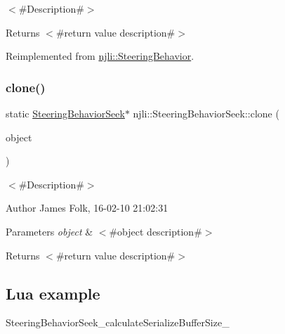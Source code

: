 $<$\#\+Description\#$>$

\begin{DoxyReturn}{Returns}
$<$\#return value description\#$>$ 
\end{DoxyReturn}


Reimplemented from \mbox{\hyperlink{classnjli_1_1_steering_behavior_abbc461d853c1b225cfde5b79d96d11bd}{njli\+::\+Steering\+Behavior}}.

\mbox{\label{classnjli_1_1_steering_behavior_seek_ae9baeaddd6dff6b7caa469e4343f9295}} 
\subsubsection{\texorpdfstring{clone()}{clone()}}
{\footnotesize\ttfamily static \mbox{\hyperlink{classnjli_1_1_steering_behavior_seek}{Steering\+Behavior\+Seek}}$\ast$ njli\+::\+Steering\+Behavior\+Seek\+::clone (\begin{DoxyParamCaption}\item[{const \mbox{\hyperlink{classnjli_1_1_steering_behavior_seek}{Steering\+Behavior\+Seek}} \&}]{object }\end{DoxyParamCaption})\hspace{0.3cm}{\ttfamily [static]}}



$<$\#\+Description\#$>$ 

\begin{DoxyAuthor}{Author}
James Folk, 16-\/02-\/10 21\+:02\+:31
\end{DoxyAuthor}

\begin{DoxyParams}{Parameters}
{\em object} & $<$\#object description\#$>$\\
\hline
\end{DoxyParams}
\begin{DoxyReturn}{Returns}
$<$\#return value description\#$>$
\end{DoxyReturn}
\hypertarget{classnjli_1_1_steering_behavior_wander_ex1}{}\subsection{Lua example}\label{classnjli_1_1_steering_behavior_wander_ex1}

\begin{DoxyCodeInclude}
\end{DoxyCodeInclude}
Steering\+Behavior\+Seek\+\_\+calculate\+Serialize\+Buffer\+Size\+\_\+ \mbox{\label{classnjli_1_1_steering_behavior_seek_a3cde3f5461f45f3576059a1ed679ff9e}} 
